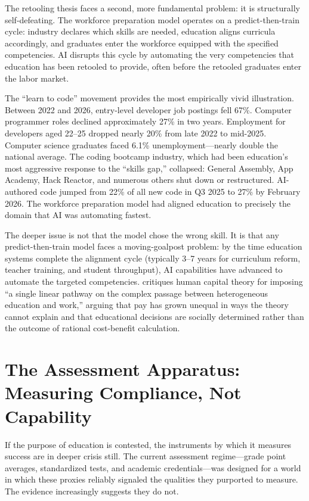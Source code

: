 \documentclass[12pt]{article}
\begin{document}
The retooling thesis faces a second, more fundamental problem: it is structurally self-defeating. The workforce preparation model operates on a predict-then-train cycle: industry declares which skills are needed, education aligns curricula accordingly, and graduates enter the workforce equipped with the specified competencies. AI disrupts this cycle by automating the very competencies that education has been retooled to provide, often before the retooled graduates enter the labor market.

The ``learn to code'' movement provides the most empirically vivid illustration. Between 2022 and 2026, entry-level developer job postings fell 67\%. Computer programmer roles declined approximately 27\% in two years. Employment for developers aged 22--25 dropped nearly 20\% from late 2022 to mid-2025. Computer science graduates faced 6.1\% unemployment---nearly double the national average. The coding bootcamp industry, which had been education's most aggressive response to the ``skills gap,'' collapsed: General Assembly, App Academy, Hack Reactor, and numerous others shut down or restructured. AI-authored code jumped from 22\% of all new code in Q3 2025 to 27\% by February 2026. The workforce preparation model had aligned education to precisely the domain that AI was automating fastest.

The deeper issue is not that the model chose the wrong skill. It is that any predict-then-train model faces a moving-goalpost problem: by the time education systems complete the alignment cycle (typically 3--7 years for curriculum reform, teacher training, and student throughput), AI capabilities have advanced to automate the targeted competencies. \citet{Auerbach2025capital} critiques human capital theory for imposing ``a single linear pathway on the complex passage between heterogeneous education and work,'' arguing that pay has grown unequal in ways the theory cannot explain and that educational decisions are socially determined rather than the outcome of rational cost-benefit calculation.

\section{The Assessment Apparatus: Measuring Compliance, Not Capability}
\label{sec:assessment}

If the purpose of education is contested, the instruments by which it measures success are in deeper crisis still. The current assessment regime---grade point averages, standardized tests, and academic credentials---was designed for a world in which these proxies reliably signaled the qualities they purported to measure. The evidence increasingly suggests they do not.
\end{document}
